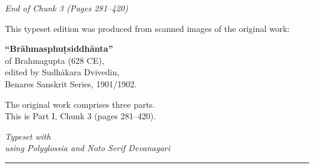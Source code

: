 \documentclass[11pt,a4paper]{article}
\newcommand{\longline}{\noindent\rule{\textwidth}{0.4pt}}
\theoremstyle{definition}
\begin{document}
\begin{center}
\textit{End of Chunk 3 (Pages 281--420)}
\end{center}

\vspace{1cm}

\begin{center}
\begin{minipage}{0.8\textwidth}
\centering
This typeset edition was produced from scanned images of the original work:

\vspace{0.3cm}
\textbf{``Br\=ahmasphu\d{t}siddh\=anta''}\\
of Brahmagupta (628 CE),\\
edited by Sudh\=akara Dvivedin,\\
Benares Sanskrit Series, 1901/1902.

\vspace{0.5cm}
The original work comprises three parts.\\
This is Part I, Chunk 3 (pages 281--420).

\vspace{0.5cm}
\textit{Typeset with \XeLaTeX\\
using Polyglossia and Noto Serif Devanagari}
\end{minipage}
\end{center}

\vspace{1cm}
\longline
\end{document}
